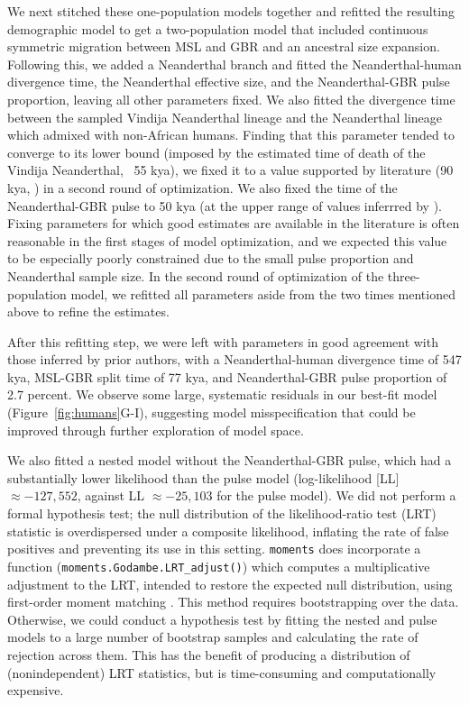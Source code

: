 \documentclass[]{article}
\newcommand{\moments}{\texttt{moments}\xspace}
\begin{document}
We next stitched these one-population models together and refitted the
resulting demographic model to get a two-population model that included
continuous symmetric migration between MSL and GBR and an ancestral size
expansion.  Following this, we added a Neanderthal branch and fitted the
Neanderthal-human divergence time, the Neanderthal effective size, and the
Neanderthal-GBR pulse proportion, leaving all other parameters fixed. We also
fitted the divergence time between the sampled Vindija Neanderthal lineage and
the Neanderthal lineage which admixed with non-African humans. Finding that
this parameter tended to converge to its lower bound (imposed by the estimated
time of death of the Vindija Neanderthal, ~55 kya), we fixed it to a value
supported by literature (90 kya, \cite{prufer2017high}) in a second round of
optimization. We also fixed the time of the Neanderthal-GBR pulse to 50 kya (at
the upper range of values inferrred by \cite{sumer2025earliest}).  Fixing
parameters for which good estimates are available in the literature is often
reasonable in the first stages of model optimization, and we expected this
value to be especially poorly constrained due to the small pulse proportion and
Neanderthal sample size. In the second round of optimization of the
three-population model, we refitted all parameters aside from the two times
mentioned above to refine the estimates. 

After this refitting step, we were left with parameters in good agreement with
those inferred by prior authors, with a Neanderthal-human divergence time of
547 kya, MSL-GBR split time of 77 kya, and Neanderthal-GBR pulse proportion of
2.7 percent. We observe some large, systematic residuals in our best-fit model
(Figure~\ref{fig:humans}G-I), suggesting model misspecification that could be
improved through further exploration of model space. 

We also fitted a nested model without the Neanderthal-GBR pulse, which had a
substantially lower likelihood than the pulse model (log-likelihood [LL]
$\approx -127,552$, against LL $\approx -25,103$ for the pulse model). We did
not perform a formal hypothesis test; the null distribution of the
likelihood-ratio test (LRT) statistic is overdispersed under a composite
likelihood, inflating the rate of false positives and preventing its use in
this setting. \moments does incorporate a function
(\texttt{moments.Godambe.LRT\_adjust()}) which computes a multiplicative
adjustment to the LRT, intended to restore the expected null distribution,
using first-order moment matching \cite{coffman2016computationally}. This
method requires bootstrapping over the data. Otherwise, we could conduct a
hypothesis test by fitting the nested and pulse models to a large number of
bootstrap samples and calculating the rate of rejection across them. This has
the benefit of producing a distribution of (nonindependent) LRT statistics, but
is time-consuming and computationally expensive.  
\end{document}
